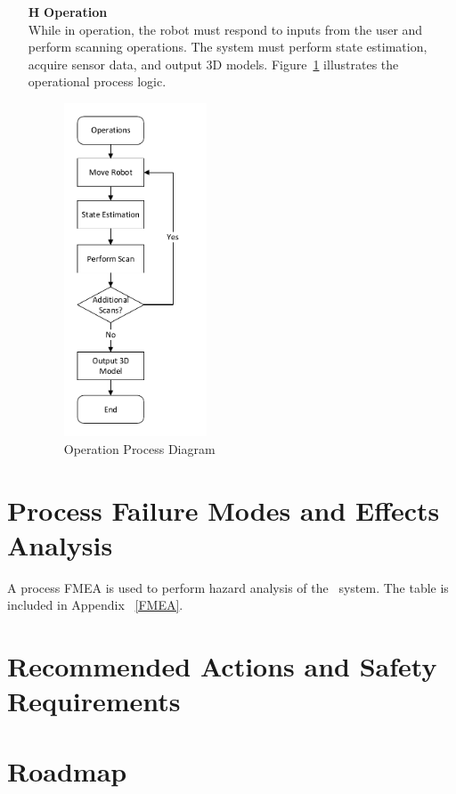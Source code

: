 \documentclass[12pt]{article}
\newcounter{haznum} %
\begin{document}
\begin{itemize}
\item[\textbf{H\refstepcounter{haznum}\thehaznum \label{H2}}] \textbf{Operation}\\
While in operation, the robot must respond to inputs from the user and perform scanning operations. The system must perform state estimation, acquire sensor data, and output 3D models. Figure~\ref{fig_Operation} illustrates the operational process logic.
\begin{figure}[H]
\centering
\includegraphics[width = 0.4\textwidth]{Figures/Operation Processes.pdf}
\caption{Operation Process Diagram}
\label{fig_Operation}
\end{figure}
\end{itemize}

\section{Process Failure Modes and Effects Analysis}

A process FMEA is used to perform hazard analysis of the \progname ~system. The table is included in Appendix ~\ref{FMEA}.

\section{Recommended Actions and Safety Requirements}

\section{Roadmap }
\end{document}
